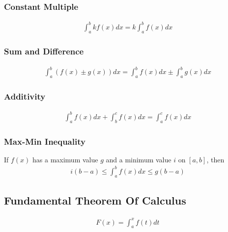 \documentclass{article}
\newcommand\intab{\int_a^b}
\begin{document}
        \subsubsection{Constant Multiple}
            \begin{gather*}
                \intab kf(x)dx = k\intab f(x)dx
            \end{gather*}
        \subsubsection{Sum and Difference}
            \begin{gather*}
                \intab (f(x)\pm g(x))dx = \intab f(x)dx \pm \intab g(x)dx
            \end{gather*}
        \subsubsection{Additivity}
            \begin{gather*}
                \intab f(x)dx + \int_b^c f(x)dx = \int_a^c f(x)dx
            \end{gather*}
        \subsubsection{Max-Min Inequality}
            If \(f(x)\) has a maximum value \(g\) and a minimum value \(i\) on \([a, b]\), then
            \begin{gather*}
                i(b-a) \leq \intab f(x)dx \leq g(b-a)
            \end{gather*}
    \subsection{Fundamental Theorem Of Calculus}
        \begin{gather*}
            F(x) = \int_a^x f(t)dt 
        \end{gather*}
\end{document}
